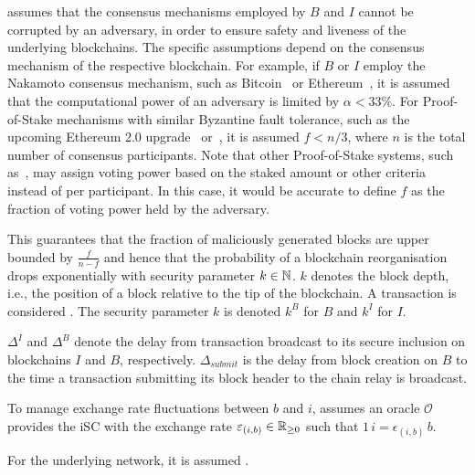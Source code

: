 \xclaim assumes that the consensus mechanisms employed by $B$ and $I$ cannot be corrupted by an adversary, in order to ensure safety and liveness of the underlying blockchains.
The specific assumptions depend on the consensus mechanism of the respective blockchain.
For example, if $B$ or $I$ employ the Nakamoto consensus mechanism, such as Bitcoin~\cite{nakamoto2008bitcoin} or Ethereum~\cite{wood2014ethereum}, it is assumed that the computational power of an adversary is limited by $\alpha < 33\%$.
For Proof-of-Stake mechanisms with similar Byzantine fault tolerance, such as the upcoming Ethereum 2.0 upgrade~\cite{Ethereum2.0pos} or~\cite{buchman2016tendermint,Kiayias2017ouroboros}, it is assumed $f<n/3$, where $n$ is the total number of consensus participants.
Note that other Proof-of-Stake systems, such as~\cite{tezos2014whitepaper}, may assign voting power based on the staked amount or other criteria instead of per participant.
In this case, it would be accurate to define $f$ as the fraction of voting power held by the adversary.

This guarantees that the fraction of maliciously generated blocks are upper bounded by $\frac{f}{n-f}$ and hence that the probability of a blockchain reorganisation drops exponentially with security parameter $k \in \mathbb{N}$. $k$ denotes the block depth, i.e., the position of a block relative to the tip of the blockchain. A transaction is considered . The security parameter $k$ is denoted $k^B$ for $B$ and $k^I$ for $I$.

$\Delta^I$ and $\Delta^B$ denote the delay from transaction broadcast to its secure inclusion on blockchains $I$ and $B$, respectively.
$\Delta_{submit}$ is the delay from block creation on $B$ to the time a transaction submitting its block header to the chain relay is broadcast.

To manage exchange rate fluctuations between $b$ and $i$, \xclaim assumes an oracle $\mathcal{O}$ provides the \textsf{iSC} with the exchange rate $\varepsilon_{(i,b)} \in \mathbb{R}_{\geq 0}$ such that $1\, i = \epsilon_{(i,b)} \, b$.

For the underlying network, it is assumed .

